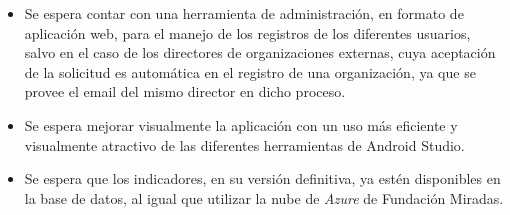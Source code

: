 \begin{itemize}
    \item Se espera contar con una herramienta de administración, en formato de
    aplicación web, para el manejo de los registros de los diferentes usuarios,
    salvo en el caso de los directores de organizaciones externas, cuya
    aceptación de la solicitud es automática en el registro de una organización,
    ya que se provee el email del mismo director en dicho proceso.
    \item Se espera mejorar visualmente la aplicación con un uso más eficiente y
    visualmente atractivo de las diferentes herramientas de Android Studio.
    \item Se espera que los indicadores, en su versión definitiva, ya estén
    disponibles en la base de datos, al igual que utilizar la nube de
    \textit{Azure} de Fundación Miradas.
\end{itemize}